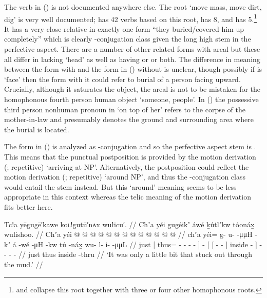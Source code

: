 The verb in (\lastx) is not documented anywhere else.
The root  ‘move mass, move dirt, dig’ is very well documented; \textcite[29–35]{leer:1976} has 42 verbs based on this root, \textcite{story-naish:1973} has 8, and \textcite{eggleston:2017} has 5.\footnote{\citeauthor{story-naish:1973} and \citeauthor{eggleston:2017} collapse this root together with three or four other homophonous roots.}
It has a very close relative in exactly one form  “they buried/covered him up completely” \parencite[34]{leer:1976} which is clearly -conjugation class given the long high  stem in the perfective aspect.
There are a number of other related forms with areal  \parencite[01/34, 39]{leer:1973} but these all differ in lacking  ‘head’ as well as having  or  or both.
The difference in meaning between the form with  and the form in (\lastx) without  is unclear, though possibly if  is ‘face’ then the form with it could refer to burial of a person facing upward.
Crucially, although it saturates the object, the areal  is not to be mistaken for the homophonous fourth person human object  ‘someone, people’.
In (\lastx) the possessive third person nonhuman pronoun  in  ‘on top of her’ refers to the corpse of the mother-in-law and  presumably denotes the ground and surrounding area where the burial is located.

The form in (\lastx) is analyzed as -conjugation and so the perfective aspect stem is .
This means that the punctual postposition  is provided by the motion derivation  (;  repetitive) ‘arriving at NP’.
Alternatively, the  postposition could reflect the motion derivation  (;  repetitive) ‘around NP’, and thus the -conjugation class would entail the  stem instead.
But this ‘around’ meaning seems to be less appropriate in this context whereas the telic meaning of the  motion derivation fits better here.

\ex\label{ex:92-138-little-bit-stick-out-thru-mud}%
%
\begingl
	\glpreamble	Tc!a yēgugē′kawe koʟ!gutū′nᴀx wułicu′. //
	\glpreamble	Chʼa yéi gugéikʼ áwé ḵútlʼkw tóonáx̱ wulishoo. //
	\gla	Chʼa {} yéi @  @ {} @ {} @ {} @ {} {}
		 @ {}
		{} {}  @ {} @ {} {}  @ {} {}
		 @ {} @ {} @ {} @ {} //
	\glb	chʼa {} yéi= g- u-  -μμH -kʼ {}
		á -wé
		{} {}  -μH -kw {} tú -náx̱ {}
		wu- l- i-  -μμL //
	\glc	just {}[ thus= - -  - - {}]
		 -
		{}[ {}[  - - {}]
			inside - {}]
		- - -  - //
	\gld	just {} thus  {} {} {} {} {}
		 {}
		{} {}  {} {} {} inside -thru {}
		 {} {} {} {} //
	\glft	‘It was only a little bit that stuck out through the mud.’
		//
\endgl
\xe

